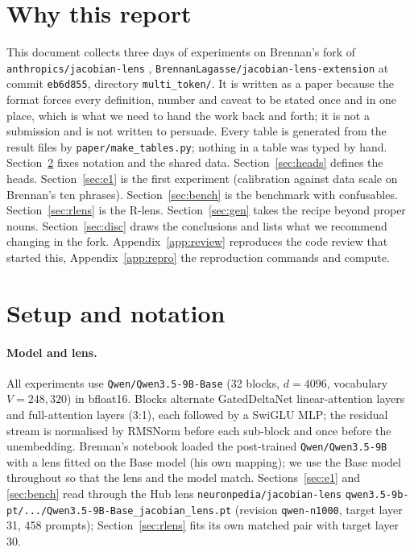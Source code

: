 \documentclass[11pt]{article}
\begin{document}
\section{Why this report}
\label{sec:why}
This document collects three days of experiments on Brennan's fork of \texttt{anthropics/jacobian-lens} \cite{gurnee2026workspace}, \texttt{BrennanLagasse/jacobian-lens-extension} at commit \texttt{eb6d855}, directory \texttt{multi\_token/}. It is written as a paper because the format forces every definition, number and caveat to be stated once and in one place, which is what we need to hand the work back and forth; it is not a submission and is not written to persuade. Every table is generated from the result files by \texttt{paper/make\_tables.py}; nothing in a table was typed by hand. Section~\ref{sec:setup} fixes notation and the shared data. Section~\ref{sec:heads} defines the heads. Section~\ref{sec:e1} is the first experiment (calibration against data scale on Brennan's ten phrases). Section~\ref{sec:bench} is the benchmark with confusables. Section~\ref{sec:rlens} is the R-lens. Section~\ref{sec:gen} takes the recipe beyond proper nouns. Section~\ref{sec:disc} draws the conclusions and lists what we recommend changing in the fork. Appendix~\ref{app:review} reproduces the code review that started this, Appendix~\ref{app:repro} the reproduction commands and compute.

\section{Setup and notation}
\label{sec:setup}

\paragraph{Model and lens.}
All experiments use \texttt{Qwen/Qwen3.5-9B-Base} (32 blocks, $d=4096$, vocabulary $V=248{,}320$) in bfloat16. Blocks alternate GatedDeltaNet linear-attention layers and full-attention layers (3:1), each followed by a SwiGLU MLP; the residual stream is normalised by RMSNorm before each sub-block and once before the unembedding. Brennan's notebook loaded the post-trained \texttt{Qwen/Qwen3.5-9B} with a lens fitted on the Base model (his own mapping); we use the Base model throughout so that the lens and the model match. Sections~\ref{sec:e1} and \ref{sec:bench} read through the Hub lens \texttt{neuronpedia/jacobian-lens} \texttt{qwen3.5-9b-pt/.../Qwen3.5-9B-Base\_jacobian\_lens.pt} (revision \texttt{qwen-n1000}, target layer 31, 458 prompts); Section~\ref{sec:rlens} fits its own matched pair with target layer 30.
\end{document}
